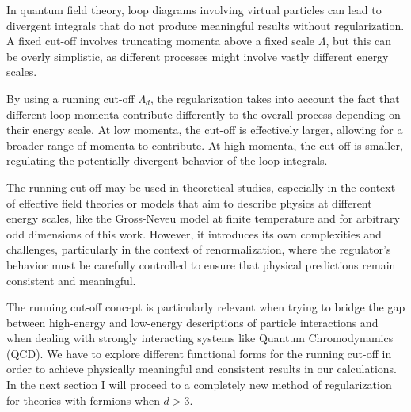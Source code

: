\documentclass[twoside]{article}
\begin{document}
In quantum field theory, loop diagrams involving virtual particles can lead to divergent integrals that do not produce meaningful results without regularization. A fixed cut-off involves truncating momenta above a fixed scale $\Lambda$, but this can be overly simplistic, as different processes might involve vastly different energy scales.

By using a running cut-off $\Lambda_d$, the regularization takes into account the fact that different loop momenta contribute differently to the overall process depending on their energy scale. At low momenta, the cut-off is effectively larger, allowing for a broader range of momenta to contribute. At high momenta, the cut-off is smaller, regulating the potentially divergent behavior of the loop integrals.

The running cut-off may be used in theoretical studies, especially in the context of effective field theories or models that aim to describe physics at different energy scales, like the Gross-Neveu model at finite temperature and for arbitrary odd dimensions of this work. However, it introduces its own complexities and challenges, particularly in the context of renormalization, where the regulator's behavior must be carefully controlled to ensure that physical predictions remain consistent and meaningful.

The running cut-off concept is particularly relevant when trying to bridge the gap between high-energy and low-energy descriptions of particle interactions and when dealing with strongly interacting systems like Quantum Chromodynamics (QCD). We have to explore different functional forms for the running cut-off in order to achieve physically meaningful and consistent results in our calculations. In the next section I will proceed to a completely new method of regularization for theories with fermions when $d>3$.
\end{document}
